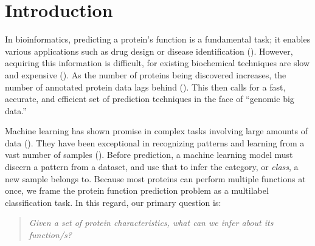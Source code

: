 %
%
%
%
%

\chapter{Introduction}
\label{Introduction}

\par In bioinformatics, predicting a protein's function is a fundamental
task; it enables various applications such as drug design or disease
identification (\cite{baldi2001bioinformatics}). However, acquiring this
information is difficult, for existing biochemical techniques are slow and
expensive (\cite{cozzetto2017computational}). As the number of proteins being
discovered increases, the number of annotated protein data lags behind
(\cite{gaudet2017gene}). This then calls for a fast, accurate, and efficient
set of prediction techniques in the face of ``genomic big data.''
  
\par Machine learning has shown promise in complex tasks involving large
amounts of data (\cite{chen2014data}). They have been exceptional in
recognizing patterns and learning from a vast number of samples
(\cite{lecun2015deep}). Before prediction, a machine learning model must
discern a pattern from a dataset, and use that to infer the category, or
\textit{class}, a new sample belongs to. Because most proteins can perform
multiple functions at once, we frame the protein function prediction problem
as a multilabel classification task. In this regard, our primary question is:

\begin{quote}
    \itshape
    \small
    Given a set of protein characteristics, what can we infer about
    its function/s?
\end{quote}

